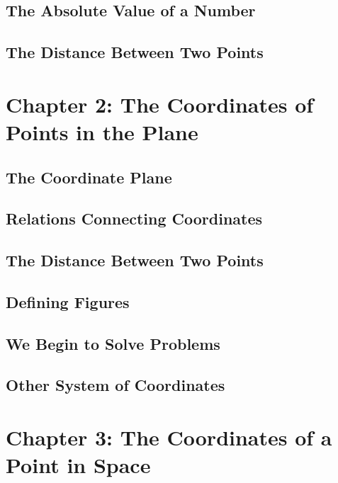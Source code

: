 \documentclass[10pt]{article}
\begin{document}

\subsection{The Absolute Value of a Number}


\subsection{The Distance Between Two Points}



\section{Chapter 2: The Coordinates of Points in the Plane}

\subsection{The Coordinate Plane}

\subsection{Relations Connecting Coordinates}

\subsection{The Distance Between Two Points}

\subsection{Defining Figures}

\subsection{We Begin to Solve Problems}

\subsection{Other System of Coordinates}



\section{Chapter 3: The Coordinates of a Point in Space}
\end{document}
